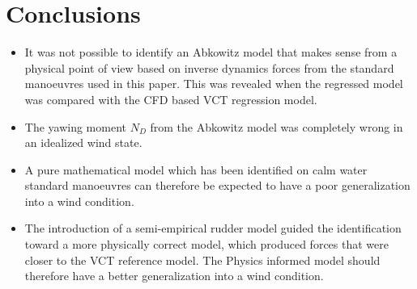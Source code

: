 \section{Conclusions}
\label{sec:conclusions}
\begin{itemize}
    \item It was not possible to identify an Abkowitz model that makes sense from a physical point of view based on inverse dynamics forces from the standard manoeuvres used in this paper. This was revealed when the regressed model was compared with the CFD based VCT regression model.
    \item The yawing moment $N_D$ from the Abkowitz model was completely wrong in an idealized wind state.
    \item A pure mathematical model which has been identified on calm water standard manoeuvres can therefore be expected to have a poor generalization into a wind condition.   
    \item The introduction of a semi-empirical rudder model guided the identification toward a more physically correct model, which produced forces that were closer to the VCT reference model. The Physics informed model should therefore have a better generalization into a wind condition.
\end{itemize}